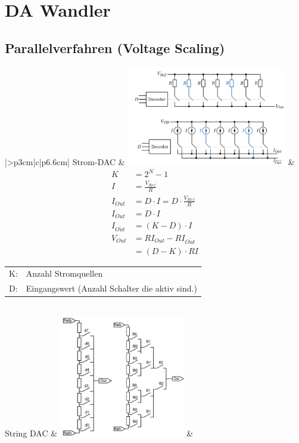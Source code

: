 \section{DA Wandler}

\subsection{Parallelverfahren (Voltage Scaling)}
\begin{tabular}{|>{\bfseries}p{3cm}|c|p{6.6cm}|}
	\hline
	Strom-DAC \hartl{456} 
	& \includegraphics[width=7cm, valign=t]{pictures/Strom-DAC}
	& {\begin{align*}
		K &=2^N-1\\
		I &=\frac{V_{Ref}}{R}\\
		I_{Out} &=D \cdot I=D\cdot\frac{V_{Ref}}{R}\\
		I_{Out} &=D \cdot I\\
		I_{\bar{Out}} &=(K-D)\cdot I\\
		V_{Out} &=RI_{Out}-RI_{\bar{Out}} \\
			    &=(D-K)\cdot RI	
	  \end{align*}}
	  \begin{tabular}{lp{5cm}}
	  	K: & Anzahl Stromquellen \\
      	D: & Eingangswert (Anzahl Schalter die aktiv sind.)
      \end{tabular}
	\\ \hline
	String DAC 
	& \includegraphics[width=5.5cm, valign=t]{pictures/string_DAC}
	& \begin{description}

\end{description}
\end{tabular}
